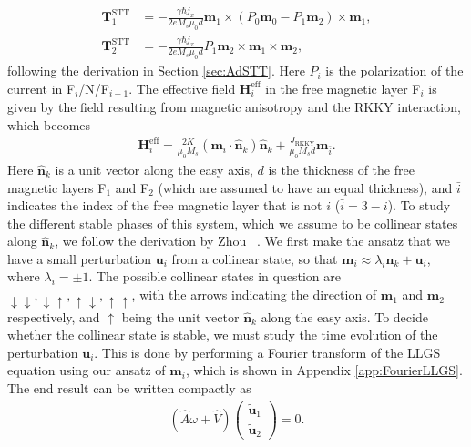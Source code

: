 \begin{subequations}
\begin{align}
    \mathbold{T}^{\text{STT}}_1 &= -\frac{\gamma \hbar j_x}{2 e M_s \mu_0 d} \mathbold{m}_1\times\left( P_0\mathbold{m}_0 - P_1 \mathbold{m}_2\right) \times \mathbold{m}_1, \\
    \mathbold{T}^{\text{STT}}_2 &= -\frac{\gamma \hbar j_x}{2 e M_s \mu_0 d} P_1 \mathbold{m}_2\times \mathbold{m}_1 \times \mathbold{m}_2,
\end{align}
\end{subequations}
following the derivation in Section \ref{sec:AdSTT}. Here $P_i$ is the polarization of the current in F$_i$/N/F$_{i+1}$. The effective field $\mathbold{H}^{\text{eff}}_i$ in the free magnetic layer F$_i$ is given by the field resulting from magnetic anisotropy and the RKKY interaction, which becomes
\begin{align}
    \mathbold{H}^{\text{eff}}_i = \frac{2K}{\mu_0 M_s}\left( \mathbold{m}_i \cdot \mathbold{\hat{n}}_k\right)\mathbold{\hat{n}}_k + \frac{J_{\text{RKKY}}}{\mu_0 M_s d} \mathbold{m}_{\bar{i}}.
\end{align}
Here $\mathbold{\hat{n}}_k$ is a unit vector along the easy axis, $d$ is the thickness of the free magnetic layers F$_1$ and F$_2$ (which are assumed to have an equal thickness), and $\bar{i}$ indicates the index of the free magnetic layer that is not $i$ ($\bar{i} = 3 - i$). To study the different stable phases of this system, which we assume to be collinear states along $\mathbold{\hat{n}}_k$, we follow the derivation by Zhou \etal~\cite{Zhou2013}. We first make the ansatz that we have a small perturbation $\mathbold{u}_i$ from a collinear state, so that $\mathbold{m}_i \approx \lambda_i\mathbold{\hat{n}}_k + \mathbold{u}_i$, where $\lambda_i = \pm 1$. The possible collinear states in question are $\downarrow\downarrow, \downarrow\uparrow, \uparrow\downarrow, \uparrow\uparrow$, with the arrows indicating the direction of $\mathbold{m}_1$ and $\mathbold{m}_2$ respectively, and $\uparrow$ being the unit vector $\mathbold{\hat{n}}_k$ along the easy axis. To decide whether the collinear state is stable, we must study the time evolution of the perturbation $\mathbold{u}_i$. This is done by performing a Fourier transform of the LLGS equation using our ansatz of $\mathbold{m}_i$, which is shown in Appendix \ref{app:FourierLLGS}. The end result can be written compactly as
\begin{align}
    \label{eq:EigenvalueEqn}
    \left(\hat{A}\omega + \hat{V}\right)
    \begin{pmatrix}
     \tilde{\mathbold{u}}_1 \\
     \tilde{\mathbold{u}}_2
    \end{pmatrix}
    = 0.
\end{align}
